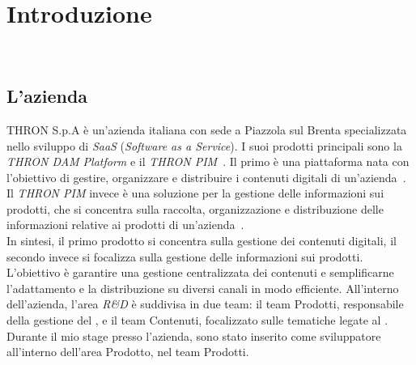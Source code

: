 \chapter{Introduzione}\label{cap:introduzione}

\\

\section{L'azienda}\label{sec:azienda}
THRON S.p.A è un'azienda italiana con sede a Piazzola sul Brenta specializzata nello sviluppo di \textit{SaaS} (\textit{Software as a Service}).
I suoi prodotti principali sono la \textit{THRON DAM Platform} e il \textit{THRON PIM}~\cite{site:thron}. 
Il primo è una piattaforma nata con l'obiettivo di gestire, organizzare e distribuire i contenuti digitali di un'azienda~\cite{site:dam}.
Il \textit{THRON PIM} invece è una soluzione per la gestione delle informazioni sui prodotti, che si concentra
sulla raccolta, organizzazione e distribuzione delle informazioni relative ai prodotti di un'azienda~\cite{site:pim}.\\
In sintesi, il primo prodotto si concentra sulla gestione dei contenuti digitali, il secondo invece
si focalizza sulla gestione delle informazioni sui prodotti.
L'obiettivo è garantire una gestione centralizzata dei contenuti e semplificarne l'adattamento e la distribuzione su diversi
canali in modo efficiente.
All'interno dell'azienda, l'area \textit{R\&D} è suddivisa in due team: il team Prodotti, responsabile della gestione
del , e il team Contenuti, focalizzato sulle tematiche legate al .\\
Durante il mio stage presso l'azienda, sono stato inserito come sviluppatore  all'interno dell'area Prodotto, nel team Prodotti.

